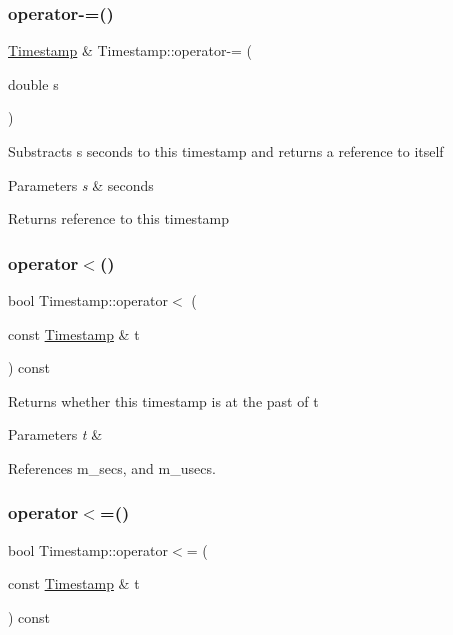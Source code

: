 \subsubsection{\texorpdfstring{operator-\/=()}{operator-=()}}
{\footnotesize\ttfamily \hyperlink{classDUtils_1_1Timestamp}{Timestamp} \& Timestamp\+::operator-\/= (\begin{DoxyParamCaption}\item[{double}]{s }\end{DoxyParamCaption})}

Substracts s seconds to this timestamp and returns a reference to itself 
\begin{DoxyParams}{Parameters}
{\em s} & seconds \\
\hline
\end{DoxyParams}
\begin{DoxyReturn}{Returns}
reference to this timestamp 
\end{DoxyReturn}
\mbox{\label{classDUtils_1_1Timestamp_a5ec33cb0b7230946e02e4afa050c445c}} 
\subsubsection{\texorpdfstring{operator$<$()}{operator<()}}
{\footnotesize\ttfamily bool Timestamp\+::operator$<$ (\begin{DoxyParamCaption}\item[{const \hyperlink{classDUtils_1_1Timestamp}{Timestamp} \&}]{t }\end{DoxyParamCaption}) const}

Returns whether this timestamp is at the past of t 
\begin{DoxyParams}{Parameters}
{\em t} & \\
\hline
\end{DoxyParams}


References m\+\_\+secs, and m\+\_\+usecs.

\mbox{\label{classDUtils_1_1Timestamp_a4fe0620f1df3aaa4d30ce9a8ba989f77}} 
\subsubsection{\texorpdfstring{operator$<$=()}{operator<=()}}
{\footnotesize\ttfamily bool Timestamp\+::operator$<$= (\begin{DoxyParamCaption}\item[{const \hyperlink{classDUtils_1_1Timestamp}{Timestamp} \&}]{t }\end{DoxyParamCaption}) const}

